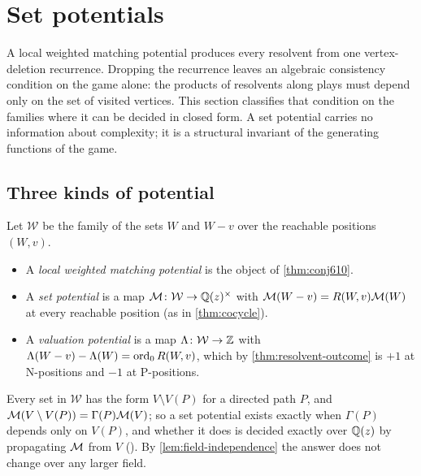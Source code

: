 \section{Set potentials}\label{sec:setpot}

A local weighted matching potential produces every resolvent from one vertex-deletion recurrence. Dropping the recurrence leaves an algebraic consistency condition on the game alone: the products of resolvents along plays must depend only on the set of visited vertices. This section classifies that condition on the families where it can be decided in closed form. A set potential carries no information about complexity; it is a structural invariant of the generating functions of the game.

\subsection{Three kinds of potential}\label{ssec:hierarchy}
Let $\mathcal W$ be the family of the sets $W$ and $W-v$ over the reachable positions $(W,v)$.
\begin{itemize}
\item A \emph{local weighted matching potential} is the object of \cref{thm:conj610}.
\item A \emph{set potential} is a map $\mathcal{M}\colon\mathcal W\to\mathbb{Q}(z)^{\times}$ with $\mathcal{M}(W-v)=R(W,v)\mathcal{M}(W)$ at every reachable position (as in \cref{thm:cocycle}).
\item A \emph{valuation potential} is a map $\Lambda\colon\mathcal W\to\mathbb{Z}$ with $\Lambda(W-v)-\Lambda(W)=\operatorname{ord}_0R(W,v)$, which by \cref{thm:resolvent-outcome} is $+1$ at N-positions and $-1$ at P-positions.
\end{itemize}
Every set in $\mathcal W$ has the form $V\setminus V(P)$ for a directed path $P$, and $\mathcal{M}(V\setminus V(P))=\Gamma(P)\mathcal{M}(V)$; so a set potential exists exactly when $\Gamma(P)$ depends only on $V(P)$, and whether it does is decided exactly over $\mathbb{Q}(z)$ by propagating $\mathcal{M}$ from $V$ (). By \cref{lem:field-independence} the answer does not change over any larger field.

